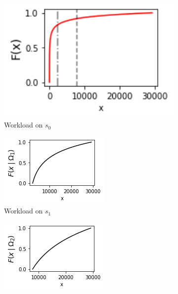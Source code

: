 \begin{figure}
	\centering
	\captionsetup{width=.8\linewidth}
	\begin{subfigure}{.3\textwidth}
		\centering
		\includegraphics[width=1.05\textwidth]{Chapter3/Figures/ws-bp-cdf}
		\caption{Workload on $s_0$}
		\label{fig:wsbp-cdf}
	\end{subfigure}%
	\hfill
	\begin{subfigure}{.3\textwidth}
		\centering
		\includegraphics[width=\textwidth]{Chapter3/Figures/wsbp-highp-cdf}
		\caption{Workload on $s_1$}
		\label{fig:highp-cdf}
	\end{subfigure}
	\hfill
	\begin{subfigure}{.3\textwidth}
	\centering
	\includegraphics[width=\textwidth]{Chapter3/Figures/wsbp-lowp-cdf}

\end{subfigure}
\end{figure}
